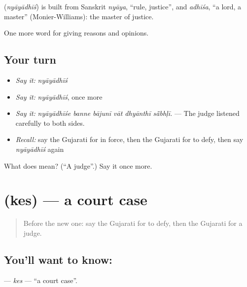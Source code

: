 \begin{cousinweb}
\textbf{} (\emph{nyāyādhīś}) is built from Sanskrit \emph{nyāya}, \textquotedblleft{}rule, justice\textquotedblright{}, and \emph{adhīśa}, \textquotedblleft{}a lord, a master\textquotedblright{} (Monier-Williams): the master of justice.
\end{cousinweb}

\begin{grammarlens}[title={What you've built}]
One more word for giving reasons and opinions.
\end{grammarlens}

\subsection*{Your turn}
\begin{itemize}
\raggedright
  \item \emph{Say it:} \emph{nyāyādhīś}
  \item \emph{Say it:} \emph{nyāyādhīś}, once more
  \item \emph{Say it:} \emph{nyāyādhīśe banne bājunī vāt dhyānthī sā̃bhḷī.} — The judge listened carefully to both sides.
  \item \emph{Recall:} say the Gujarati for in force, then the Gujarati for to defy, then say \emph{nyāyādhīś} again
\end{itemize}

\begin{tcolorbox}[breakable,colback=teal!4,colframe=teal!35!black,title={Before you move on}]
What does  mean? (\textquotedblleft{}A judge\textquotedblright{}.) Say it once more.
\end{tcolorbox}
\section[\texorpdfstring{\gu{કેસ} (kes)}{કેસ (kes)}]{ (kes) — a court case}

\label{lesson:GU-C348-kes}



\begin{quote}
Before the new one: say the Gujarati for to defy, then the Gujarati for a judge.
\end{quote}

\subsection*{You'll want to know: }
\textbf{} — \emph{kes} — \textquotedblleft{}a court case\textquotedblright{}.

